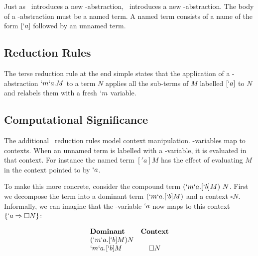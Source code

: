   Just as \lam\ introduces a new \lam-abstraction, \lmu\ introduces a new 
  \lmu-abstraction. The body of a \lmu-abstraction must be a named term. 
  A named term consists of a name of the form $[`a]$ followed by an unnamed 
  term. 

  \subsection{Reduction Rules}
  \begin{figure}[!h]
  \end{figure}

  The terse reduction rule at the end simple states that the application
  of a \lmu-abstraction $`m`a.M$ to a term $N$ applies all the sub-terms 
  of $M$ labelled $[`a]$ to $N$ and relabels them with a fresh $`m$ 
  variable.
  
  \subsection{Computational Significance}


  The additional \lmu\ reduction rules model context manipulation. 
  \lmu-variables map to contexts. When an unnamed term is labelled with a 
  \lmu-variable, it is evaluated in that context. For instance the named 
  term $['a]M$ has the effect of evaluating $M$ in the context pointed to 
  by $`a$.
  
  To make this more concrete, consider the compound term $(`m`a.[`b]M)\ N$. 
  First we decompose the term into a dominant term $(`m`a.[`b]M)$ and a 
  context $\square N$. Informally, we can imagine that the \lmu-variable 
  $`a$ now maps to this context $\{`a \Rightarrow \square N\}$:
  
  \begin{example}[]
    \[
    \begin{array}{lc}
    \textbf{Dominant} & \textbf{Context} \\
    (`m`a.[`b]M) N \\
    `m`a.[`b]M & \square N \\
    \end{array}
    \]
  \end{example}

